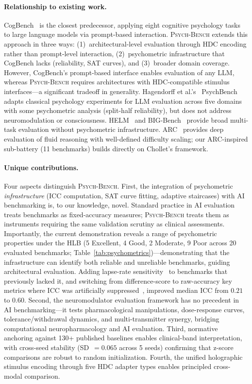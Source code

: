 \documentclass[11pt,letterpaper]{article}
\newcommand{\psychbench}{\textsc{Psych-Bench}}
\newcommand{\hlb}{\textsc{HLB}}
\begin{document}
\paragraph{Relationship to existing work.} CogBench~\citep{codaforno2024cogbench} is the closest predecessor, applying eight cognitive psychology tasks to large language models via prompt-based interaction. \psychbench{} extends this approach in three ways: (1)~architectural-level evaluation through HDC encoding rather than prompt-level interaction, (2)~psychometric infrastructure that CogBench lacks (reliability, SAT curves), and (3)~broader domain coverage. However, CogBench's prompt-based interface enables evaluation of any LLM, whereas \psychbench{} requires architectures with HDC-compatible stimulus interfaces---a significant tradeoff in generality. Hagendorff et al.'s~\citep{hagendorff2023machine} PsychBench adapts classical psychology experiments for LLM evaluation across five domains with some psychometric analysis (split-half reliability), but does not address neuromodulation or consciousness. HELM~\citep{liang2023holistic} and BIG-Bench~\citep{srivastava2023beyond} provide broad multi-task evaluation without psychometric infrastructure. ARC~\citep{chollet2019measure} provides deep evaluation of fluid reasoning with well-defined difficulty scaling; our ARC-inspired sub-battery (11 benchmarks) builds directly on Chollet's framework.

\paragraph{Unique contributions.} Four aspects distinguish \psychbench{}. First, the integration of psychometric \emph{infrastructure} (ICC computation, SAT curve fitting, adaptive staircases) with AI benchmarking is, to our knowledge, novel. Standard practice in AI evaluation treats benchmarks as fixed-accuracy measures; \psychbench{} treats them as instruments requiring the same validation scrutiny as clinical assessments. Importantly, the current demonstration reveals a range of psychometric properties under the \hlb{} (5 Excellent, 4 Good, 2 Moderate, 9 Poor across 20 evaluated benchmarks; Table~\ref{tab:psychometrics})---demonstrating that the infrastructure can identify both reliable and unreliable benchmarks, guiding architectural evaluation. Adding lapse-rate sensitivity~\citep{wichmann2001psychometric} to benchmarks that previously lacked it, and switching from difference-score to raw-accuracy key metrics where ICC was artificially suppressed~\citep{cronbach1970essentials}, improved median ICC from $0.21$ to $0.60$. Second, the neuromodulator evaluation framework has no precedent in AI benchmarking---it tests pharmacological manipulations, dose-response curves, tolerance/withdrawal dynamics, and multi-transmitter synergy, bridging computational neuropharmacology and AI evaluation. Third, normative anchoring against 130+ published baselines enables clinical-band interpretation, with cross-seed stability (SD~$= 0.065$ across 5 seeds) confirming that z-score comparisons are robust to random initialization. Fourth, the unified holographic stimulus encoding through five HDC adapter types enables principled cross-modal comparison.
\end{document}
